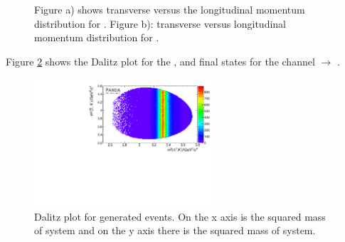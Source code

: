 \begin{figure}
	\caption{\propose Figure a) shows transverse versus the longitudinal momentum distribution for \anticascade. Figure b):
			transverse versus longitudinal momentum distribution for \excitedcascade.}
	\label{fig:MC_xi_pt_vs_pz}
\end{figure}

Figure \ref{fig:eventgeneration_Dalitz} shows the Dalitz plot for the \lam, \kminus and \anticascade final states for 
the channel \pbarpSystem $\rightarrow$ \excitedcascade \anticascade. 

\begin{figure}
	\centering
	\includegraphics[width=0.6\textwidth]{./plots/Dalitzplot_MC.pdf}
	\caption{\propose \anticascade\lam\kminus Dalitz plot for generated events. On the x axis is the squared mass of \lam\kminus system and on the y axis there is the squared mass of \anticascade\kminus system.}
	\label{fig:eventgeneration_Dalitz}
\end{figure}

